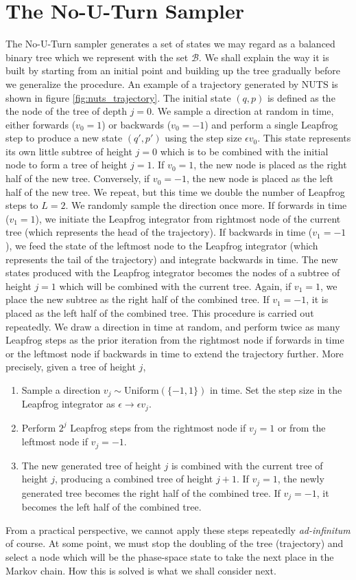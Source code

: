 \section{The No-U-Turn Sampler}
The No-U-Turn sampler generates a set of states we may regard as a balanced binary tree which we represent with the set $\mathcal{B}$. 
We shall explain the way it is built by starting from an initial point and building up the tree gradually before we generalize the procedure. An example of a trajectory generated by NUTS is shown in figure \ref{fig:nuts_trajectory}. 
The initial state $(q, p)$ is defined as the the node of the tree of depth $j = 0$. We sample a direction at random in time, either forwards ($v_0 = 1$) or backwards ($v_0 = -1$) and perform a single Leapfrog step to produce a new state $(q', p')$ using the step size $\epsilon v_0$. This state represents its own little subtree of height $j = 0$ which is to be combined with the initial node to form a tree of height $j = 1$. If $v_0 = 1$, the new node is placed as the right half of the new tree. Conversely, if $v_0 = -1$, the new node is placed as the left half of the new tree. We repeat, but this time we double the number of Leapfrog steps to $L = 2$. We randomly sample the direction once more. If forwards in time ($v_1 = 1$), we initiate the Leapfrog integrator from rightmost node of the current tree (which represents the head of the trajectory). If backwards in time ($v_1 = -1$), we feed the state of the leftmost node to the Leapfrog integrator (which represents the tail of the trajectory) and integrate backwards in time. The new states produced with the Leapfrog integrator becomes the nodes of a subtree of height $j = 1$ which will be combined with the current tree. Again, if $v_1 = 1$, we place the new subtree as the right half of the combined tree. If $v_1 = -1$, it is placed as the left half of the combined tree. 
This procedure is carried out repeatedly. We draw a direction in time at random, and perform twice as many Leapfrog steps as the prior iteration from the rightmost node if forwards in time or the leftmost node if backwards in time to extend the trajectory further. More precisely, given a tree of height $j$, 
\begin{enumerate}
    \item Sample a direction $v_j \sim \text{Uniform}(\{-1, 1\})$ in time. Set the step size in the Leapfrog integrator as $\epsilon \to \epsilon v_j$.
    \item Perform $2^j$ Leapfrog steps from the rightmost node if $v_j = 1$ or from the leftmost node if $v_j = -1$.  
    \item The new generated tree of height $j$ is combined with the current tree of height $j$, producing a combined tree of height $j + 1$. If $v_j = 1$, the newly generated tree becomes the right half of the combined tree. If $v_j = -1$, it becomes the left half of the combined tree.
\end{enumerate}
From a practical perspective, we cannot apply these steps repeatedly \textit{ad-infinitum} of course. At some point, we must stop the doubling of the tree (trajectory) and select a node which will be the phase-space state to take the next place in the Markov chain. How this is solved is what we shall consider next.


